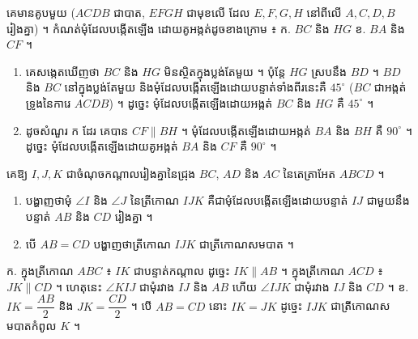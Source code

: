 \begin{example}[លំហាត់គំរូ]
គេមានគូបមួយ ($ACDB$ ជាបាត, $EFGH$ ជាមុខលើ ដែល $E, F, G, H$ នៅពីលើ $A, C, D, B$ រៀងគ្នា) ។ កំណត់មុំដែលបង្កើតឡើង ដោយគូអង្កត់ដូចខាងក្រោម ៖ ក. $BC$ និង $HG$ \quad ខ. $BA$ និង $CF$ ។
\ans
\begin{center}
\end{center}
\begin{enumerate}[a]
  \item គេសង្កេតឃើញថា $BC$ និង $HG$ មិនស្ថិតក្នុងប្លង់តែមួយ ។ ប៉ុន្តែ $HG$ ស្របនឹង $BD$ ។ $BD$ និង $BC$ នៅក្នុងប្លង់តែមួយ និងមុំដែលបង្កើតឡើងដោយបន្ទាត់ទាំងពីរនេះគឺ $45^\circ$ ($BC$ ជាអង្កត់ទ្រូងនៃការេ $ACDB$) ។ ដូច្នេះ មុំដែលបង្កើតឡើងដោយអង្កត់ $BC$ និង $HG$ គឺ $45^\circ$ ។
  \item ដូចសំណួរ ក ដែរ គេបាន $CF \parallel BH$ ។ មុំដែលបង្កើតឡើងដោយអង្កត់ $BA$ និង $BH$ គឺ $90^\circ$ ។ ដូច្នេះ មុំដែលបង្កើតឡើងដោយគូអង្កត់ $BA$ និង $CF$ គឺ $90^\circ$ ។
\end{enumerate}
\end{example}

\begin{pro}
គេឱ្យ $I, J, K$ ជាចំណុចកណ្ដាលរៀងគ្នានៃជ្រុង $BC$, $AD$ និង $AC$ នៃតេត្រាអែត $ABCD$ ។
\begin{enumerate}[a]
  \item បង្ហាញថាមុំ $\angle I$ និង $\angle J$ នៃត្រីកោណ $IJK$ គឺជាមុំដែលបង្កើតឡើងដោយបន្ទាត់ $IJ$ ជាមួយនឹងបន្ទាត់ $AB$ និង $CD$ រៀងគ្នា ។
  \item បើ $AB = CD$ បង្ហាញថាត្រីកោណ $IJK$ ជាត្រីកោណសមបាត ។
\end{enumerate}
\ans
ក. ក្នុងត្រីកោណ $ABC$ ៖ $IK$ ជាបន្ទាត់កណ្ដាល ដូច្នេះ $IK \parallel AB$ ។ ក្នុងត្រីកោណ $ACD$ ៖ $JK \parallel CD$ ។ ហេតុនេះ $\angle KIJ$ ជាមុំរវាង $IJ$ និង $AB$ ហើយ $\angle IJK$ ជាមុំរវាង $IJ$ និង $CD$ ។ \quad ខ. $IK = \dfrac{AB}{2}$ និង $JK = \dfrac{CD}{2}$ ។ បើ $AB = CD$ នោះ $IK = JK$ ដូច្នេះ $IJK$ ជាត្រីកោណសមបាតកំពូល $K$ ។
\end{pro}

